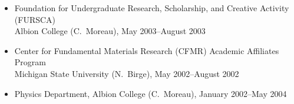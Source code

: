\begin{itemize}
{		Characterized APEX silicon detectors, including in-beam testing. %
		Designed and machined detector mounts. 
	}
	\item Foundation for Undergraduate Research, Scholarship, and Creative Activity (FURSCA)\\ Albion College (C.\ Moreau), May 2003--August 2003
	\item Center for Fundamental Materials Research (CFMR) Academic Affiliates Program\\Michigan State University (N.\ Birge), May 2002--August 2002
	\item Physics Department, Albion College (C.\ Moreau), January 2002--May 2004
\fi
\end{itemize}%

